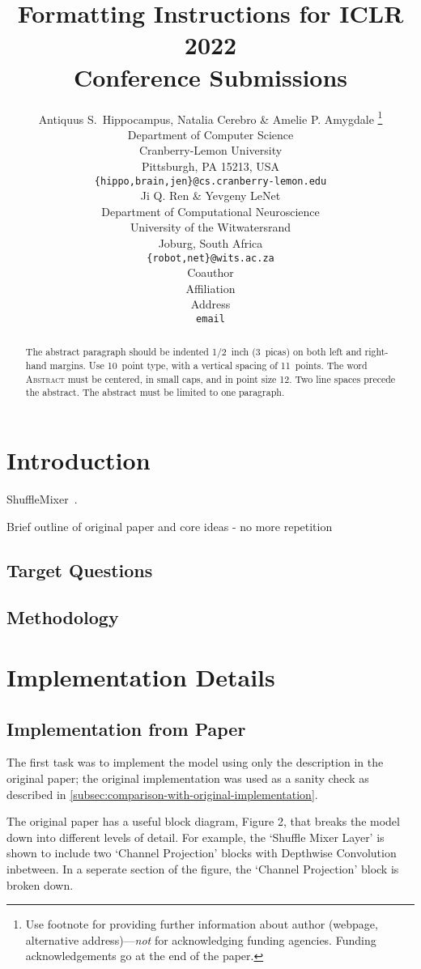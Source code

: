 \documentclass{article}
\title{Formatting Instructions for ICLR 2022 \\ Conference Submissions}
\author{Antiquus S.~Hippocampus, Natalia Cerebro \& Amelie P. Amygdale \thanks{ Use footnote for providing further information
about author (webpage, alternative address)---\emph{not} for acknowledging
funding agencies.  Funding acknowledgements go at the end of the paper.} \\
Department of Computer Science\\
Cranberry-Lemon University\\
Pittsburgh, PA 15213, USA \\
\texttt{\{hippo,brain,jen\}@cs.cranberry-lemon.edu} \\
\And
Ji Q. Ren \& Yevgeny LeNet \\
Department of Computational Neuroscience \\
University of the Witwatersrand \\
Joburg, South Africa \\
\texttt{\{robot,net\}@wits.ac.za} \\
\AND
Coauthor \\
Affiliation \\
Address \\
\texttt{email}
}
\begin{document}
    \maketitle

    \begin{abstract}
    The abstract paragraph should be indented 1/2~inch (3~picas) on both left and
    right-hand margins. Use 10~point type, with a vertical spacing of 11~points.
    The word \textsc{Abstract} must be centered, in small caps, and in point size 12. Two
    line spaces precede the abstract. The abstract must be limited to one
    paragraph.
    \end{abstract}

    \section{Introduction}

    ShuffleMixer~\citep{sun2022shufflemixer}.

    Brief outline of original paper and core ideas - no more repetition

    \subsection{Target Questions}

    \subsection{Methodology}

    \section{Implementation Details}

    \subsection{Implementation from Paper}

    The first task was to implement the model using only the description in the original paper; the original implementation was used as a sanity check as described in \cref{subsec:comparison-with-original-implementation}.

    The original paper has a useful block diagram, Figure 2, that breaks the model down into different levels of detail. For example, the `Shuffle Mixer Layer' is shown to include two `Channel Projection' blocks with Depthwise Convolution inbetween. In a seperate section of the figure, the `Channel Projection' block is broken down.
\end{document}
